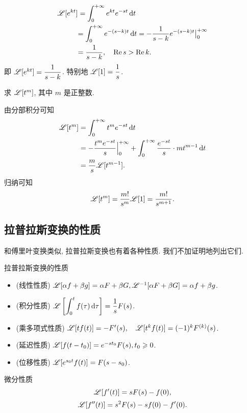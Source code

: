\begin{solution}
	\begin{align*}
		\mathscr{L}[e^{kt}]&=\int_0^{+\infty}e^{kt}e^{-st}\,\mathrm{d} t\\
		&{=\int_0^{+\infty}e^{-(s-k)t}\,\mathrm{d} t
		=-\frac1{s-k}e^{-(s-k)t}\big|_0^{+\infty}}\\
		&{=\frac1{s-k}, \quad\operatorname{Re} s>\operatorname{Re} k.}
	\end{align*}
	即 \emph{$\mathscr{L}[e^{kt}]=\dfrac1{s-k}$}.
	特别地 \emph{$\mathscr{L}[1]=\dfrac1s$}.
\end{solution}

\begin{example}
	求 $\mathscr{L}[t^m]$, 其中 $m$ 是正整数.
\end{example}

\begin{solution}
	由分部积分可知
	\begin{align*}
		\mathscr{L}[t^m]&=\int_0^{+\infty}t^me^{-st}\,\mathrm{d} t\\
		&=-\frac{t^me^{-st}}s\Big|_0^{+\infty}+\int_0^{+\infty}\frac{e^{-st}}s\cdot mt^{m-1}\,\mathrm{d} t\\
		&=\frac ms\mathscr{L}[t^{m-1}].
	\end{align*}
	归纳可知
		\[\mathscr{L}[t^m]=\frac{m!}{s^m}\mathscr{L}[1]=\frac{m!}{s^{m+1}}.\]
\end{solution}

\subsection{拉普拉斯变换的性质}

和傅里叶变换类似, 拉普拉斯变换也有着各种性质. 我们不加证明地列出它们.

\begin{block}{拉普拉斯变换的性质}
	\begin{itemize}
		\item (线性性质) $\mathscr{L}[\alpha f+\beta g]=\alpha F+\beta G, \mathscr{L}^{-1}[\alpha F+\beta G]=\alpha f+\beta g$.
		\item (积分性质) $\displaystyle\mathscr{L}\left[\int_0^t f(\tau)\,\mathrm{d}\tau\right]=\frac 1s F(s)$.
		\item (乘多项式性质) $\mathscr{L}[tf(t)]=-F'(s),\quad\mathscr{L}[t^kf(t)]=(-1)^kF^{(k)}(s)$.
		\item (延迟性质) $\mathscr{L}[f(t-t_0)]=e^{-st_0}F(s), t_0\geqslant 0$.
		\item (位移性质) $\mathscr{L}[e^{s_0t}f(t)]=F(s-s_0)$.
	\end{itemize}
\end{block}

\begin{alertblock}{微分性质}
	\[\mathscr{L}[f'(t)]=sF(s)-f(0),\]
	\[\mathscr{L}[f''(t)]=s^2F(s)-sf(0)-f'(0).\]
\end{alertblock}

